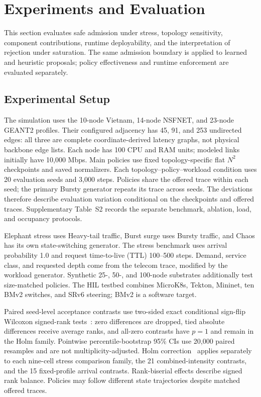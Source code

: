 \documentclass[final,5p]{elsarticle}
\newcommand{\rev}[1]{\textcolor{revisiongreen}{#1}}
\let\newrev\rev
\begin{document}
\section{Experiments and Evaluation}
\label{sec:evaluation}
This section evaluates safe admission under stress, topology sensitivity, component contributions, runtime deployability, and the interpretation of rejection under saturation. \newrev{The same admission boundary is applied to learned and heuristic proposals; policy effectiveness and runtime enforcement are evaluated separately.}

\subsection{Experimental Setup}
\label{subsec:experimental_setup}
\newrev{The simulation uses the 10-node Vietnam, 14-node NSFNET, and 23-node GEANT2 profiles. Their configured adjacency has 45, 91, and 253 undirected edges: all three are complete coordinate-derived latency graphs, not physical backbone edge lists. Each node has 100 CPU and RAM units; modeled links initially have 10,000 Mbps. Main policies use fixed topology-specific flat \(N^2\) checkpoints and saved normalizers. Each topology--policy--workload condition uses 20 evaluation seeds and 3,000 steps. Policies share the offered trace within each seed; the primary Bursty generator repeats its trace across seeds. The deviations therefore describe evaluation variation conditional on the checkpoints and offered traces. Supplementary Table~S2 records the separate benchmark, ablation, load, and occupancy protocols.}

\newrev{Elephant stress uses Heavy-tail traffic, Burst surge uses Bursty traffic, and Chaos has its own state-switching generator. The stress benchmark uses arrival probability 1.0 and request time-to-live (TTL) 100--500 steps. Demand, service class, and requested depth come from the telecom trace, modified by the workload generator. Synthetic 25-, 50-, and 100-node substrates additionally test size-matched policies. The HIL testbed combines MicroK8s, Tekton, Mininet, ten BMv2 switches, and SRv6 steering; BMv2 is a software target.}

\newrev{Paired seed-level acceptance contrasts use two-sided exact conditional sign-flip Wilcoxon signed-rank tests~\cite{wilcoxon1945}: zero differences are dropped, tied absolute differences receive average ranks, and all-zero contrasts have \(p=1\) and remain in the Holm family. Pointwise percentile-bootstrap 95\% CIs use 20,000 paired resamples and are not multiplicity-adjusted. Holm correction~\cite{holm1979} applies separately to each nine-cell stress comparison family, the 21 combined-intensity contrasts, and the 15 fixed-profile arrival contrasts. Rank-biserial effects describe signed rank balance. Policies may follow different state trajectories despite matched offered traces.}
\end{document}
